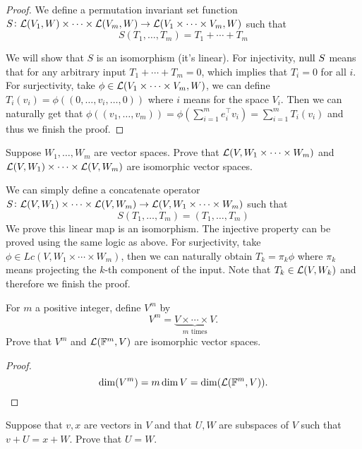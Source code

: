 \documentclass{extarticle}
\begin{document}
\begin{proof}

We define a permutation invariant set function \(S \colon \mathcal{L}(V_1, W) \times \cdots \times \mathcal{L}(V_m, W)
\to \mathcal{L}(V_1 \times \cdots \times V_m, W)\) such that 
\[S(T_1, \ldots, T_m) = T_1 + \cdots + T_m\]

We will show that \(S\) is an isomorphism (it's linear). For injectivity, \(\text{null } S\) means that 
for any arbitrary input \(T_1 + \cdots + T_m = 0\), which implies that \(T_i = 0\) for all \(i\). 
For surjectivity, take \(\phi \in \mathcal{L}(V_1 \times \cdots \times V_m, W)\), we can define 
\(T_i(v_i) = \phi((0, \ldots, v_i, \ldots, 0))\) where \(i\) means for the space \(V_i\). Then we can 
naturally get that \(\phi((v_1, \ldots, v_m))= \phi(\sum_{i=1}^{m}e_i^\top v_i) = \sum_{i=1}^{m} T_i (v_i) \)
and thus we finish the proof.

\end{proof}

\begin{problem}{4}
    Suppose \(W_1, \ldots, W_m\) are vector spaces. Prove that \(\mathcal{L}(V, W_1 \times \cdots \times W_m)\)
    and \(\mathcal{L}(V, W_1) \times \cdots \times \mathcal{L}(V, W_m)\) are isomorphic vector spaces. 
\end{problem}

We can simply define a concatenate operator \(S \colon \mathcal{L}(V, W_1) \times \cdots \times 
\mathcal{L}(V, W_m) \to \mathcal{L}(V, W_1 \times \cdots \times W_m)\) such that 
\[S(T_1, \ldots, T_m) = (T_1, \ldots, T_m)\]
We prove this linear map is an isomorphism. The injective property can be proved using the same logic as 
above. For surjectivity, take \(\phi \in Lc(V, W_1 \times \cdots \times W_m)\), then we can naturally 
obtain \(T_k = \pi_k \phi\) where \(\pi_k\) means projecting the \(k\)-th component of the input. Note that 
\(T_k \in \mathcal{L}(V, W_k)\) and therefore we finish the proof. 


\begin{problem}{5}
    For \(m\) a positive integer, define \(V^m\) by 
    \[V^m = \underbrace{V \times \cdots \times V}_{m \text{ times}}.\]
    Prove that \(V^m\) and \(\mathcal{L}(\mathbb{F}^m, V)\) are isomorphic vector spaces. 
\end{problem}

\begin{proof}
\[\dim (V^m) = m \dim V = \dim(\mathcal{L}(\mathbb{F}^m, V)).\]
\end{proof}

\begin{problem}{6}
    Suppose that \(v, x\) are vectors in \(V\) and that \(U, W\) are subspaces of \(V\)
    such that \(v + U = x + W\). Prove that \(U = W\).  
\end{problem}
\end{document}
